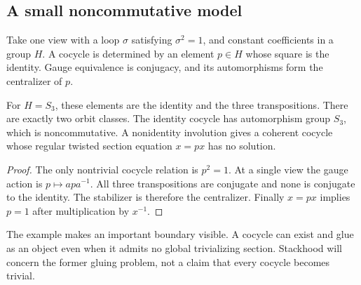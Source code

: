 \subsection{A small noncommutative model}
\begin{KSexample}\label{KS:KS33}
Take one view with a loop \(\sigma\) satisfying \(\sigma^2=1\), and constant coefficients in a group \(H\). A cocycle is determined by an element \(p\in H\) whose square is the identity. Gauge equivalence is conjugacy, and its automorphisms form the centralizer of \(p\).

For \(H=S_3\), these elements are the identity and the three transpositions. There are exactly two orbit classes. The identity cocycle has automorphism group \(S_3\), which is noncommutative. A nonidentity involution gives a coherent cocycle whose regular twisted section equation \(x=px\) has no solution.
\end{KSexample}
\begin{proof}
The only nontrivial cocycle relation is \(p^2=1\). At a single view the gauge action is \(p\mapsto apa^{-1}\). All three transpositions are conjugate and none is conjugate to the identity. The stabilizer is therefore the centralizer. Finally \(x=px\) implies \(p=1\) after multiplication by \(x^{-1}\).
\end{proof}
The example makes an important boundary visible. A cocycle can exist and glue as an object even when it admits no global trivializing section. Stackhood will concern the former gluing problem, not a claim that every cocycle becomes trivial.

